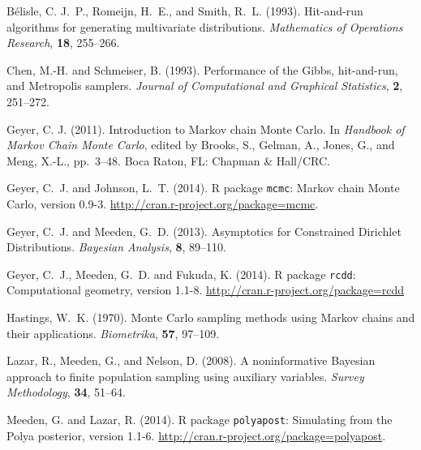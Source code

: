 \documentclass[11pt]{article}
\begin{document}
\begin{thebibliography}{}

B\'{e}lisle, C. J.~P., Romeijn, H.~E., and Smith, R.~L. (1993).
\newblock Hit-and-run algorithms for generating multivariate distributions.
\newblock \emph{Mathematics of Operations Research}, \textbf{18}, 255--266.

Chen, M.-H. and Schmeiser, B. (1993).
\newblock Performance of the Gibbs, hit-and-run, and Metropolis samplers.
\newblock \emph{Journal of Computational and Graphical Statistics},
   \textbf{2}, 251--272.

Geyer, C. J. (2011).
\newblock Introduction to Markov chain Monte Carlo.
\newblock In \emph{Handbook of Markov Chain Monte Carlo}, edited by
    Brooks, S., Gelman, A., Jones, G., and Meng, X.-L., pp.~3--48.
\newblock Boca Raton, FL: Chapman \& Hall/CRC.

Geyer, C.~J. and Johnson, L.~T. (2014).
\newblock R package \texttt{mcmc}: Markov chain Monte Carlo,
    version 0.9-3.
\newblock \url{http://cran.r-project.org/package=mcmc}.

Geyer, C.~J. and Meeden, G.~D. (2013).
\newblock Asymptotics for Constrained Dirichlet Distributions.
\newblock \emph{Bayesian Analysis}, \textbf{8}, 89--110.

Geyer, C.~J., Meeden, G.~D. and Fukuda, K. (2014).
\newblock R package \texttt{rcdd}: Computational geometry,
    version 1.1-8.
\newblock \url{http://cran.r-project.org/package=rcdd}

Hastings, W.~K. (1970).
\newblock Monte Carlo sampling methods using Markov chains and their
    applications.
\newblock \emph{Biometrika}, \textbf{57}, 97--109.

Lazar, R., Meeden, G., and Nelson, D. (2008).
\newblock A noninformative {B}ayesian approach to finite population sampling
  using auxiliary variables.
\newblock \emph{Survey Methodology}, \textbf{34}, 51--64.

Meeden, G. and Lazar, R. (2014).
\newblock R package \texttt{polyapost}: Simulating from the Polya posterior,
    version 1.1-6.
\newblock \url{http://cran.r-project.org/package=polyapost}.


\end{thebibliography}
\end{document}
